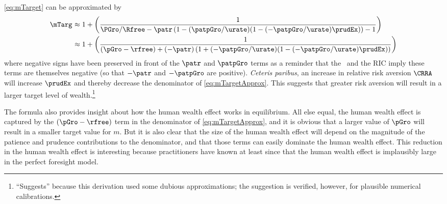 \documentclass{\handout}
\begin{document}
\eqref{eq:mTarget} can be approximated by
\begin{equation}\begin{gathered}\begin{aligned}
 \mTarg^{\null} & \approx  1 + \left(\frac{1}{\PGro/\Rfree-\patr \left(1-(\patpGro/\urate)(1-(-\patpGro/\urate)\prudEx) \right)-1}\right)
\\ & \approx  1 + \left(\frac{1}{(\pGro-\rfree)+(-\patr) \left(1+(-\patpGro/\urate)(1-(-\patpGro/\urate)\prudEx)\right)}\right)
\label{eq:mTargetApprox}
\end{aligned}\end{gathered}\end{equation}
where negative signs have been preserved in front of the $\patr$ and $\patpGro$ terms as a reminder that
the \GICPGro~and the RIC imply these terms are themselves negative (so that $-\patr$ and $-\patpGro$ are positive).
{\it Ceteris paribus}, an increase in relative risk aversion $\CRRA$ will increase $\prudEx$ and thereby decrease the denominator of \eqref{eq:mTargetApprox}.  This suggests that
greater risk aversion will result in a larger target level of wealth.\footnote{``Suggests'' because
this derivation used some dubious approximations; the suggestion is verified, however, for
plausible numerical calibrations.}


The formula also provides insight about how the human wealth effect
works in equilibrium.  All else equal, the human wealth effect is captured
by the $(\pGro-\rfree)$ term in the denominator of \eqref{eq:mTargetApprox},
and it is obvious that a larger value of $\pGro$ will result in a smaller
target value for $m$.  But it is also clear that the size of the human wealth
effect will depend on the magnitude of the patience and prudence contributions
to the denominator, and that those terms can easily dominate the human wealth
effect.  This reduction in the human wealth effect is interesting because practitioners have known at least since
\cite{summersCapTax} that the human wealth effect is implausibly large in the
perfect foresight model.
\end{document}
